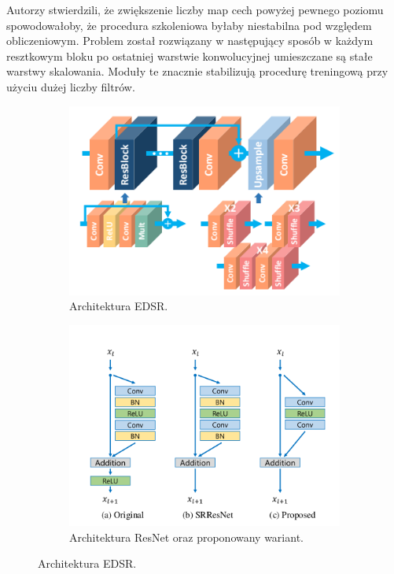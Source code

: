 \documentclass[a4paper,11pt, notitlepage ]{article}
\begin{document}
  Autorzy stwierdzili, że zwiększenie liczby map cech powyżej pewnego poziomu spowodowałoby, że procedura szkoleniowa byłaby niestabilna pod względem obliczeniowym. Problem został rozwiązany w następujący sposób w każdym resztkowym bloku po ostatniej warstwie konwolucyjnej umieszczane są stałe warstwy skalowania. Moduły te znacznie stabilizują procedurę treningową przy użyciu dużej liczby filtrów.
 

\begin{figure}[h!]
	\centering
	\begin{subfigure}[b]{0.4\linewidth}
	\includegraphics[width=\textwidth]{EDSR/EDSR_2.png}
	\caption{Architektura EDSR.}
	\end{subfigure}
	\begin{subfigure}[b]{0.4\linewidth}
		\includegraphics[width=\linewidth]{resudualbloc.png}
		\caption{Architektura ResNet oraz proponowany wariant.}
	\end{subfigure}
	\caption{Architektura EDSR.}
	\label{fig:coffee3}
\end{figure}
\end{document}

